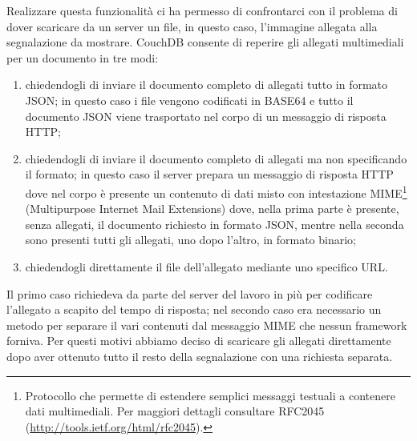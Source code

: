 			
			Realizzare questa funzionalità ci ha permesso di confrontarci con il 
			problema di dover scaricare da un server un file, in questo caso, 
			l'immagine allegata alla segnalazione da mostrare. CouchDB 
			consente di reperire gli allegati multimediali per un documento in 
			tre modi:
			\begin{enumerate}
				\item chiedendogli di inviare il documento completo di allegati 
				tutto in formato JSON; in questo caso i file vengono codificati 
				in BASE64 e tutto il documento JSON viene trasportato nel corpo 
				di un messaggio di risposta HTTP;
				\item chiedendogli di inviare il documento completo di allegati 
				ma non specificando il formato; in questo caso il server prepara 
				un messaggio di risposta HTTP dove nel corpo è presente un 
				contenuto di dati misto con intestazione 
				MIME\footnote{Protocollo che permette di estendere semplici 
				messaggi testuali a contenere dati multimediali. Per maggiori 
				dettagli consultare RFC2045 
				(\url{http://tools.ietf.org/html/rfc2045}).} (Multipurpose 
				Internet Mail Extensions) dove, nella prima parte è presente, 
				senza allegati, il documento richiesto in formato JSON, mentre 
				nella seconda sono presenti tutti gli allegati, uno dopo 
				l'altro, in formato binario;
				\item chiedendogli direttamente il file dell'allegato mediante 
				uno specifico URL.
			\end{enumerate}
			Il primo caso richiedeva da parte del server del lavoro in più per 
			codificare l'allegato a scapito del tempo di risposta; nel secondo 
			caso era necessario un metodo per separare il vari contenuti dal 
			messaggio MIME che nessun framework forniva. Per questi motivi 
			abbiamo deciso di scaricare gli allegati direttamente dopo aver 
			ottenuto tutto il resto della segnalazione con una richiesta 
			separata.
			
